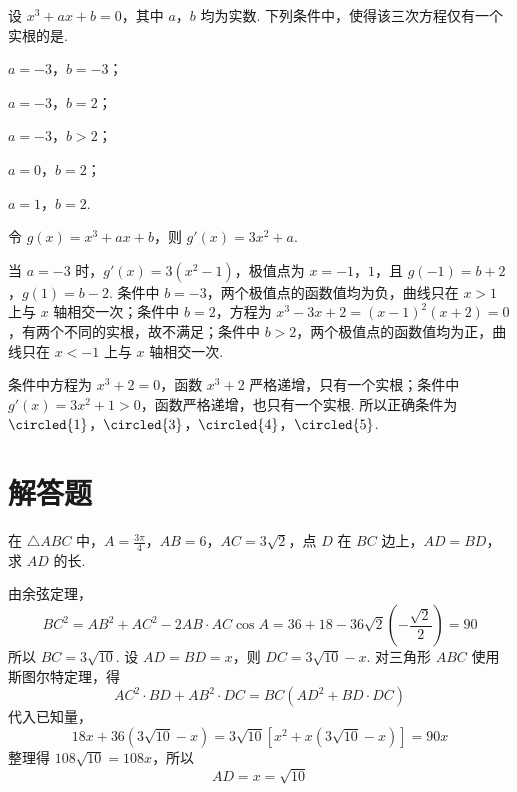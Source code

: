 \begin{problem}
设 \(x^{3} + ax + b = 0\)，其中 \(a\)，\(b\) 均为实数. 下列条件中，使得该三次方程仅有一个实根的是\fillinblank{}.

\begin{circlelist}
\item \(a = -3\)，\(b = -3\)；
\item \(a = -3\)，\(b = 2\)；
\item \(a = -3\)，\(b > 2\)；
\item \(a = 0\)，\(b = 2\)；
\item \(a = 1\)，\(b = 2\).
\end{circlelist}

\begin{solution}
令 \(g(x)=x^3+ax+b\)，则 \(g'(x)=3x^2+a\).

当 \(a=-3\) 时，\(g'(x)=3(x^2-1)\)，极值点为 \(x=-1\)，\(1\)，且
\(g(-1)=b+2\)，\(g(1)=b-2\).
条件中 \(b=-3\)，两个极值点的函数值均为负，曲线只在 \(x>1\) 上与 \(x\) 轴相交一次；条件中 \(b=2\)，方程为
\(x^3-3x+2=(x-1)^2(x+2)=0\)，有两个不同的实根，故不满足；条件中 \(b>2\)，两个极值点的函数值均为正，曲线只在 \(x<-1\) 上与 \(x\) 轴相交一次.

条件中方程为 \(x^3+2=0\)，函数 \(x^3+2\) 严格递增，只有一个实根；条件中 \(g'(x)=3x^2+1>0\)，函数严格递增，也只有一个实根. 所以正确条件为 \(\circled{1}\)，\(\circled{3}\)，\(\circled{4}\)，\(\circled{5}\).
\end{solution}
\end{problem}

\section{解答题}

\begin{problem}
在 \(\triangle ABC\) 中，\(A = \frac{3\pi}{4}\)，\(AB = 6\)，\(AC = 3\sqrt{2}\)，点 \(D\) 在 \(BC\) 边上，\(AD = BD\)，求 \(AD\) 的长.
\begin{solution}
由余弦定理，
\[
BC^2=AB^2+AC^2-2AB\cdot AC\cos A=36+18-36\sqrt2\left(-\frac{\sqrt2}{2}\right)=90
\]
所以 \(BC=3\sqrt{10}\). 设 \(AD=BD=x\)，则 \(DC=3\sqrt{10}-x\). 对三角形 \(ABC\) 使用斯图尔特定理，得
\[
AC^2\cdot BD+AB^2\cdot DC=BC\left(AD^2+BD\cdot DC\right)
\]
代入已知量，
\[
18x+36(3\sqrt{10}-x)=3\sqrt{10}\left[x^2+x(3\sqrt{10}-x)\right]=90x
\]
整理得 \(108\sqrt{10}=108x\)，所以
\[
AD=x=\sqrt{10}
\]
\end{solution}
\end{problem}

